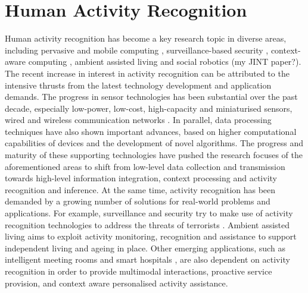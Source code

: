 \section{Human Activity Recognition}
\label{sec:soa:har}


Human activity recognition has become a key research topic in diverse areas, including pervasive and mobile computing \cite{Weiser1991} \cite{Choudhury2008}, surveillance-based security \cite{Poppe2010} \cite{Akdemir2008} \cite{Weinland2011}, context-aware computing \cite{Laerhoven2001} \cite{Wren2006}, ambient assisted living \cite{Philipose2004} \cite{Cook2009} \cite{Kasteren2008} \cite{Chen2012a} and social robotics \cite{Fong2003a} (my JINT paper?). The recent increase in interest in activity recognition can be attributed to the intensive thrusts from the latest technology development and application demands. The progress in sensor technologies has been substantial over the past decade, especially low-power, low-cost, high-capacity and miniaturised sensors, wired and wireless communication networks \cite{Pantelopoulos2010} \cite{Alemdar2010} \cite{Ding2011}. In parallel, data processing techniques have also shown important advances, based on higher computational capabilities of devices and the development of novel algorithms. The progress and maturity of these supporting technologies have pushed the research focuses of the aforementioned areas to shift from low-level data collection and transmission towards high-level information integration, context processing and activity recognition and inference. At the same time, activity recognition has been demanded by a growing number of solutions for real-world problems and applications. For example, surveillance and security try to make use of activity recognition technologies to address the threats of terrorists \cite{Akdemir2008}. Ambient assisted living aims to exploit activity monitoring, recognition and assistance to support independent living and ageing in place. Other emerging applications, such as intelligent meeting rooms \cite{Mikic2000} and smart hospitals \cite{Sanchez2008}, are also dependent on activity recognition in order to provide multimodal interactions, proactive service provision, and context aware personalised activity assistance. 

